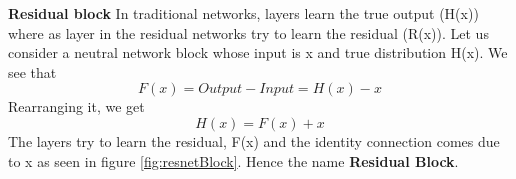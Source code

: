 \begin{flushleft} \textbf{Residual block}
In traditional networks, layers learn the true output (H(x)) where as layer in the residual networks try to learn the residual (R(x)). Let us consider a neutral network block whose input is x and true distribution H(x). We see that \newline
\begin{equation}
    F(x) = Output - Input = H(x) - x 
\end{equation}
Rearranging it, we get
\begin{equation} \label{Output}
    H(x) = F(x) + x
\end{equation}
The layers try to learn the residual, F(x) and the identity connection comes due to x as seen in figure \ref{fig:resnetBlock}. Hence the name \textbf{Residual Block}. \end{flushleft}


